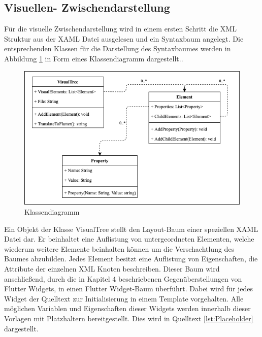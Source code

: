 \subsection{Visuellen- Zwischendarstellung}

Für die visuelle Zwischendarstellung wird in einem ersten Schritt die XML Struktur
aus der XAML Datei ausgelesen und ein Syntaxbaum angelegt.  Die entsprechenden Klassen für die Darstellung des Syntaxbaumes werden in Abbildung \ref{fig:Klassendiagram} in Form eines Klassendiagramm dargestellt..
\newpage

\begin{figure}[!ht]
 \includegraphics[width=\textwidth,keepaspectratio]{Images/Implementation/Klassendiagram.png}
 \caption{Klassendiagramm}
 \label{fig:Klassendiagram}
\end{figure}

Ein Objekt der Klasse VisualTree stellt den Layout-Baum einer speziellen XAML Datei dar.  Er beinhaltet eine Auflistung von untergeordneten Elementen, welche wiederum weitere Elemente beinhalten können um die Verschachtlung des Baumes abzubilden.  Jedes Element besitzt eine Auflistung von Eigenschaften, die Attribute der einzelnen XML Knoten beschreiben.  Dieser Baum wird anschließend,  durch die in Kapitel 4 beschriebenen Gegenüberstellungen von Flutter Widgets, in einen Flutter Widget-Baum überführt.  Dabei wird für jedes Widget der Quelltext zur Initialisierung in einem Template vorgehalten.  Alle möglichen Variablen und Eigenschaften dieser Widgets werden innerhalb dieser Vorlagen mit Platzhaltern bereitgestellt.  Dies wird in Quelltext \ref{lst:Placeholder} dargestellt.

 


